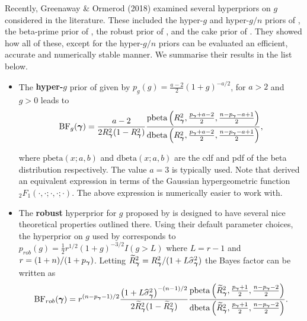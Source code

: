 Recently, Greenaway \& Ormerod (2018) examined several hyperpriors on $g$ considered in the literature.
These included the hyper-$g$ and hyper-$g/n$ priors of \cite{Liang2008}, the beta-prime prior of \cite{Maruyama2011}, 
the robust prior of \cite{Bayarri2012}, and the cake prior of \cite{OrmerodEtal2017}. They showed how 
all of these, except for the hyper-$g/n$ priors can be evaluated an efficient, accurate and 
numerically stable manner. 
We summarise their results in the list below.
\begin{itemize}
	\item The {\bf hyper-$g$} prior of \cite{Liang2008} given by
	$p_{g}(g) = \frac{a - 2}{2}(1 + g)^{-a/2}$,
	for $a>2$ and $g>0$ leads to
	\begin{equation}\label{eq:hyperGmarginal2}
	\displaystyle \mbox{BF}_g({\boldsymbol \gamma})
	=  
	\frac{a - 2}{2 R_{\boldsymbol \gamma}^2(1 - R_{\boldsymbol \gamma}^2)} 
	\frac{\mbox{pbeta}\left(R_{\boldsymbol \gamma}^2,\tfrac{p_{\boldsymbol \gamma} + a - 2}{2},\tfrac{n-p_{\boldsymbol \gamma} - a+1}{2}\right)}{
		\mbox{dbeta}\left(R_{\boldsymbol \gamma}^2,\tfrac{p_{\boldsymbol \gamma} + a - 2}{2},\tfrac{n-p_{\boldsymbol \gamma} - a+1}{2}\right)},
	\end{equation}
	
	where $\mbox{pbeta}(x;a,b)$ and $\mbox{dbeta}(x;a,b)$  are the cdf and pdf of the beta 
		distribution respectively. The value $a=3$ is typically used. Note that \cite{Liang2008} derived an equivalent expression in terms of the Gaussian hypergeometric function ${}_2 F_{1}(\cdot,\cdot;\cdot,\cdot;\cdot)$. The above expression is numerically easier to work with.
		
		\item The {\bf robust} hyperprior for $g$ proposed by \cite{Bayarri2012} is designed to have several nice theoretical
		properties outlined there. Using their default parameter
		choices, the hyperprior 
		on $g$ used by \cite{Bayarri2012} corresponds to 
		$p_{{rob}}(g) = \tfrac{1}{2}r^{1/2} (1 + g)^{-3/2} I(g>L)$  where $L = r - 1$ and $r = (1 + n)/(1 + p_{\boldsymbol \gamma})$. 
		Letting $\widetilde{R}_{\boldsymbol \gamma}^2 = R_{\boldsymbol \gamma}^2/(1 + L\widehat{\sigma}_{\boldsymbol \gamma}^2)$
		the Bayes factor can be written as
		\begin{equation}\label{eq:yGivenGammaRobust2}
		\displaystyle \mbox{BF}_{{rob}}({\boldsymbol \gamma})
		= r^{(n - p_{\boldsymbol \gamma} - 1)/2} \frac{\left( 1 + L\widehat{\sigma}_{\boldsymbol \gamma}^2 \right)^{-(n - 1)/2}}{2 \widetilde{R}_{\boldsymbol \gamma}^2(1 - \widetilde{R}_{\boldsymbol \gamma}^2)} 
		\frac{
			\mbox{pbeta}\left( 
			\widetilde{R}_{\boldsymbol \gamma}^2,
			\frac{p_{\boldsymbol \gamma} +1}{2},
			\frac{n - p_{\boldsymbol \gamma} - 2}{2} 
			\right)
		}{
			\mbox{dbeta}\left( 
			\widetilde{R}_{\boldsymbol \gamma}^2,
			\frac{p_{\boldsymbol \gamma} +1}{2},
			\frac{n - p_{\boldsymbol \gamma} - 2}{2} 
			\right)
		}.
		\end{equation}
		

\end{itemize}
